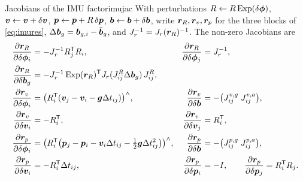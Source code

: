 \begin{proposition}{Jacobians of the IMU factor}{imujac}
With perturbations $R\leftarrow R\operatorname{Exp}(\delta\bm{\phi})$, $\bm{v}\leftarrow
\bm{v}+\delta\bm{v}$, $\bm{p}\leftarrow\bm{p}+R\,\delta\bm{p}$, $\bm{b}\leftarrow
\bm{b}+\delta\bm{b}$, write $\bm{r}_R,\bm{r}_v,\bm{r}_p$ for the
three blocks of \eqref{eq:imures}, $\Delta\bm{b}_g=\bm{b}_{g,i}-
\bar{\bm{b}}_g$, and $J_r^{-1}=J_r(\bm{r}_R)^{-1}$. The non-zero
Jacobians are
\begin{align*}
\frac{\partial\bm{r}_R}{\partial\delta\bm{\phi}_i}&=-J_r^{-1}R_j^{\mathsf{T}} R_i,&
\frac{\partial\bm{r}_R}{\partial\delta\bm{\phi}_j}&=J_r^{-1},\\
\frac{\partial\bm{r}_R}{\partial\delta\bm{b}_g}&=-J_r^{-1}
\operatorname{Exp}(\bm{r}_R)^{\mathsf{T}} J_r(J^R_{ij}\Delta\bm{b}_g)\,J^R_{ij},\\
\frac{\partial\bm{r}_v}{\partial\delta\bm{\phi}_i}&=\bigl(R_i^{\mathsf{T}}(
\bm{v}_j-\bm{v}_i-\bm{g}\Delta t_{ij})\bigr)^{\wedge},&
\frac{\partial\bm{r}_v}{\partial\delta\bm{b}}&=-\bigl(J^{v,g}_{ij}\;
J^{v,a}_{ij}\bigr),\\
\frac{\partial\bm{r}_v}{\partial\delta\bm{v}_i}&=-R_i^{\mathsf{T}},&
\frac{\partial\bm{r}_v}{\partial\delta\bm{v}_j}&=R_i^{\mathsf{T}},\\
\frac{\partial\bm{r}_p}{\partial\delta\bm{\phi}_i}&=\bigl(R_i^{\mathsf{T}}
\bigl(\bm{p}_j-\bm{p}_i-\bm{v}_i\Delta t_{ij}-\tfrac12\bm{g}\Delta t_{ij}^2
\bigr)\bigr)^{\wedge},&
\frac{\partial\bm{r}_p}{\partial\delta\bm{b}}&=-\bigl(J^{p,g}_{ij}\;
J^{p,a}_{ij}\bigr),\\
\frac{\partial\bm{r}_p}{\partial\delta\bm{v}_i}&=-R_i^{\mathsf{T}}\Delta t_{ij},&
\frac{\partial\bm{r}_p}{\partial\delta\bm{p}_i}&=-I,\qquad
\frac{\partial\bm{r}_p}{\partial\delta\bm{p}_j}=R_i^{\mathsf{T}} R_j .
\end{align*}
\end{proposition}

